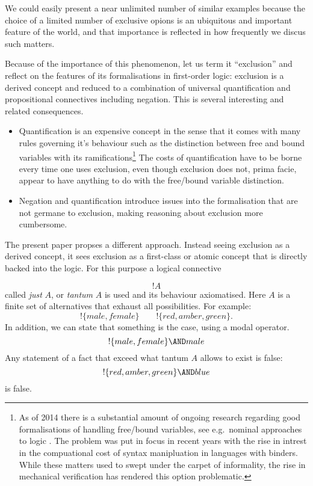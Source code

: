 \NI We could easily present a near unlimited number of similar
examples because the choice of a limited number of exclusive opions is
an ubiquitous and important feature of the world, and that importance
is reflected in how frequently we discus such matters.

Because of the importance of this phenomenon, let us term it
``exclusion'' and reflect on the features of its formalisations in
first-order logic: exclusion is a derived concept and reduced to a
combination of universal quantification and propositional connectives
including negation. This is several interesting and related
consequences.

\begin{itemize}


\item Quantification is an expensive concept in the sense that it comes with
      many rules governing it's behaviour such as the distinction
      between free and bound variables with its
      ramifications\footnote{As of 2014 there is a substantial amount
      of ongoing research regarding good formalisations of handling
      free/bound variables, see e.g.~nominal approaches to
      logic \cite{PittsAM:newaas,PittsAM:nomsetnasics}. The problem
      was put in focus in recent years with the rise in intrest in the
      compuational cost of syntax manipluation in languages with
      binders. While these matters used to swept under the carpet of
      informality, the rise in mechanical verification has rendered
      this option problematic.} The costs of quantification have to be
      borne every time one uses exclusion, even though exclusion does
      not, prima facie, appear to have anything to do with the
      free/bound variable distinction.

\item Negation and quantification introduce issues into the formalisation
      that are not germane to exclusion, making reasoning about
      exclusion more cumbersome.

\end{itemize}

\NI The present paper propses a different approach. Instead seeing exclusion as
a derived concept, it sees exclusion as a first-class or atomic
concept that is directly backed into the logic. For this purpose a
logical connective

\[
   !A
\]
called \emph{just} $A$, or \emph{tantum} $A$ is used and its behaviour
axiomatised. Here $A$ is a finite set of alternatives that exhaust all
possibilities. For example:
\[
   !\{male, female\}
      \qquad
   !\{red, amber, green\}.
\]
In addition, we can state that something is the case, using a modal operator.
\[
   !\{male, female\} \AND male
\]
Any statement of a fact that exceed what tantum $A$ allows to exist is
false:
\[
   !\{red, amber, green\} \AND blue
\]
is false.

